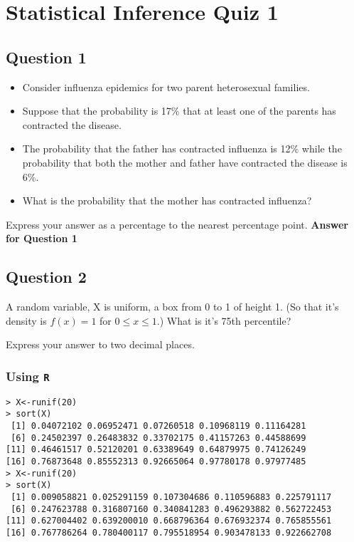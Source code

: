 \documentclass[]{article}
\begin{document}
\section{Statistical Inference Quiz 1}


\subsection{Question 1}

\begin{itemize}
\item Consider influenza epidemics for two parent heterosexual families. 
\item Suppose that the probability is 17\% that at least one of the parents has contracted the disease. 
\item The probability that the father has contracted influenza is 12\% while the probability that both the mother and father have contracted the disease is 6\%. 
\item What is the probability that the mother has contracted influenza?
\end{itemize}
Express your answer as a percentage to the nearest percentage point.
\textbf{Answer for Question 1}
\subsection{Question 2}
A random variable, X is uniform, a box from 0 to 1 of height 1. (So that it's density is $f(x)=1$ for $0\leq x\leq 1$.) 
What is it's 75th percentile?

Express your answer to two decimal places.
\subsubsection{Using \texttt{R}}
\begin{verbatim}
> X<-runif(20)
> sort(X)
 [1] 0.04072102 0.06952471 0.07260518 0.10968119 0.11164281
 [6] 0.24502397 0.26483832 0.33702175 0.41157263 0.44588699
[11] 0.46461517 0.52120201 0.63389649 0.64879975 0.74126249
[16] 0.76873648 0.85552313 0.92665064 0.97780178 0.97977485
> X<-runif(20)
> sort(X)
 [1] 0.009058821 0.025291159 0.107304686 0.110596883 0.225791117
 [6] 0.247623788 0.316807160 0.340841283 0.496293882 0.562722453
[11] 0.627004402 0.639200010 0.668796364 0.676932374 0.765855561
[16] 0.767786264 0.780400117 0.795518954 0.903478133 0.922662708
\end{verbatim}
\end{document}
